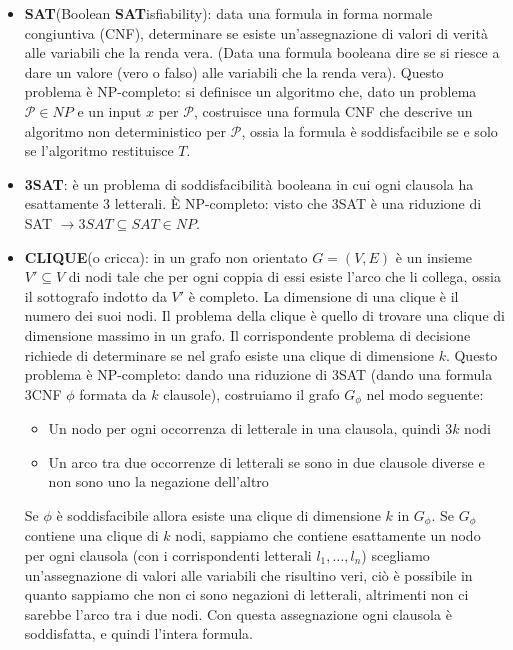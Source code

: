\documentclass[12pt]{article}
\begin{document}
\begin{itemize}
    \item \textbf{SAT}(Boolean \textbf{SAT}isfiability): data una formula in forma normale congiuntiva (CNF), determinare se esiste un'assegnazione di valori di verità alle variabili che la renda vera. (Data una formula booleana dire se si riesce a dare un valore (vero o falso) alle variabili che la renda vera). Questo problema è NP-completo: si definisce un algoritmo che, dato un problema $\mathcal{P}\in NP$ e un input $x$ per $\mathcal{P}$, costruisce una formula CNF che descrive un algoritmo non deterministico per $\mathcal{P}$, ossia la formula è soddisfacibile se e solo se l'algoritmo restituisce $T$.
    \item \textbf{3SAT}: è un problema di soddisfacibilità booleana in cui ogni clausola ha esattamente 3 letterali. È NP-completo: visto che 3SAT è una riduzione di SAT $\rightarrow 3SAT\subseteq SAT \in NP$.
    \item \textbf{CLIQUE}(o cricca): in un grafo non orientato $G=(V,E)$ è un insieme $V'\subseteq V$ di nodi tale che per ogni coppia di essi esiste l'arco che li collega, ossia il sottografo indotto da $V'$ è completo. La dimensione di una clique è il numero dei suoi nodi. Il problema della clique è quello di trovare una clique di dimensione massimo in un grafo. Il corrispondente problema di decisione richiede di determinare se nel grafo esiste una clique di dimensione $k$. Questo problema è NP-completo: dando una riduzione di 3SAT (dando una formula 3CNF $\phi$ formata da $k$ clausole), costruiamo il grafo $G_{\phi}$ nel modo seguente: \begin{itemize}
        \item Un nodo per ogni occorrenza di letterale in una clausola, quindi $3k$ nodi
        \item Un arco tra due occorrenze di  letterali se sono in due clausole diverse e non sono uno la negazione dell'altro
    \end{itemize}
    Se $\phi$ è soddisfacibile allora esiste una clique di dimensione $k$ in $G_{\phi}$. Se $G_{\phi}$ contiene una clique di $k$ nodi, sappiamo che contiene esattamente un nodo per ogni clausola (con i corrispondenti letterali $l_{1},\ldots,l_{n}$) scegliamo un'assegnazione di valori alle variabili che risultino veri, ciò è possibile in quanto sappiamo che non ci sono negazioni di letterali, altrimenti non ci sarebbe l'arco tra i due nodi. Con questa assegnazione ogni clausola è soddisfatta, e quindi l'intera formula.
\end{itemize}
\end{document}

